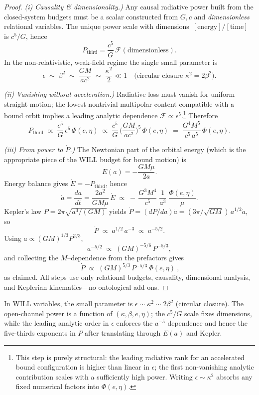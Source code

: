 \documentclass[12pt, a4paper]{article}
\begin{document}
\begin{proof}
\textit{(i) Causality \& dimensionality.)} Any causal radiative power built from the closed-system budgets must be a scalar constructed from $G,c$ and \emph{dimensionless} relational variables. The unique power scale with dimensions $\,[\text{energy}]/[\text{time}]$ is $c^{5}/G$, hence
\[
P_{\text{third}}=\frac{c^{5}}{G}\, \mathcal{F}(\text{dimensionless}).
\]
In the non-relativistic, weak-field regime the single small parameter is
\[
\epsilon\;\sim\;\beta^{2}\;\sim\;\frac{GM}{ac^{2}}\;\sim\;\frac{\kappa^{2}}{2}\ll1
\quad\text{(circular closure } \kappa^{2}=2\beta^{2}\text{)}.
\]

\textit{(ii) Vanishing without acceleration.)} Radiative loss must vanish for uniform straight motion; the lowest nontrivial multipolar content compatible with a bound orbit implies a leading analytic dependence $\mathcal{F}\propto \epsilon^{5}$.\footnote{This step is purely structural: the leading radiative rank for an accelerated bound configuration is higher than linear in $\epsilon$; the first non-vanishing analytic contribution scales with a sufficiently high power. Writing $\epsilon\!\sim\!\kappa^{2}$ absorbs any fixed numerical factors into $\Phi(e,\eta)$.}
Therefore
\[
P_{\text{third}} \;\propto\; \frac{c^{5}}{G}\,\epsilon^{5}\,\Phi(e,\eta)
\;\propto\;
\frac{c^{5}}{G}\,\biggl(\frac{GM}{ac^{2}}\biggr)^{5}\,\Phi(e,\eta)
\;=\; \frac{G^{4}M^{5}}{c^{5}\,a^{5}}\,\Phi(e,\eta).
\]

\textit{(iii) From power to $\dot P$.)}
The Newtonian part of the orbital energy (which is the appropriate piece of the WILL budget for bound motion) is
\[
E(a)=-\frac{GM\mu}{2a}.
\]
Energy balance gives $\dot E=-P_{\text{third}}$, hence
\[
\dot a=\frac{da}{dt}
=\frac{2a^{2}}{GM\mu}\,\dot E
\;\propto\; -\,\frac{G^{3}M^{4}}{c^{5}}\;\frac{1}{a^{3}}\;\frac{\Phi(e,\eta)}{\mu}.
\]
Kepler’s law $P=2\pi\sqrt{a^{3}/(GM)}$ yields $\dot P=(dP/da)\dot a=(3\pi/\sqrt{GM})\,a^{1/2}\dot a$, so
\[
\dot P \;\propto\; a^{1/2}\,a^{-3}\;\propto\;a^{-5/2}.
\]
Using $a\propto (GM)^{1/3}P^{2/3}$,
\[
a^{-5/2}\;\propto\;(GM)^{-5/6}\,P^{-5/3},
\]
and collecting the $M$–dependence from the prefactors gives
\[
\boxed{\ \dot P \;\propto\;(GM)^{5/3}\,P^{-5/3}\,\Phi(e,\eta)\ },
\]
as claimed. All steps use only relational budgets, causality, dimensional analysis, and Keplerian kinematics—no ontological add-ons.
\end{proof}

\begin{tcolorbox}[colback=gray!4, colframe=black!60, title=Relational reading]
In WILL variables, the small parameter is $\epsilon\sim \kappa^{2}\sim 2\beta^{2}$ (circular closure). The open-channel power is a function of $(\kappa,\beta,e,\eta)$; the $c^{5}/G$ scale fixes dimensions, while the leading analytic order in $\epsilon$ enforces the $a^{-5}$ dependence and hence the five-thirds exponents in $\dot P$ after translating through $E(a)$ and Kepler.
\end{tcolorbox}
\end{document}
